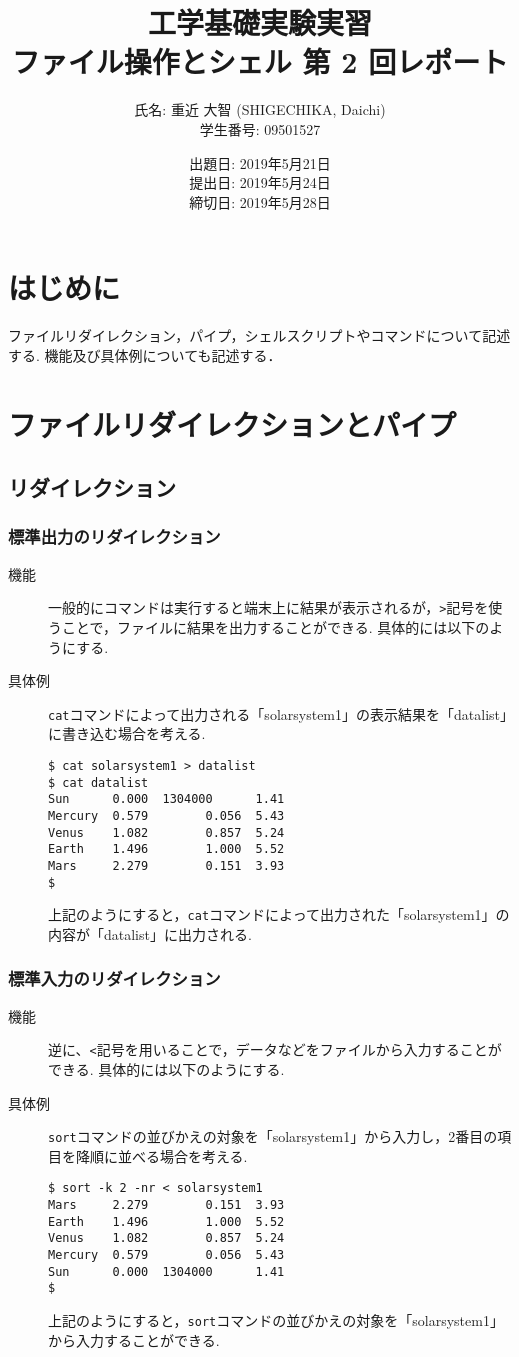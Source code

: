 \documentclass[a4j,11pt]{jarticle}
\title{工学基礎実験実習 \\
       ファイル操作とシェル 第 2 回レポート}
\author{氏名: 重近 大智 (SHIGECHIKA, Daichi) \\
        学生番号: 09501527}
\date{出題日: 2019年5月21日 \\
      提出日: 2019年5月24日 \\
      締切日: 2019年5月28日 \\}
\begin{document}
\maketitle

\section{はじめに}
ファイルリダイレクション，パイプ，シェルスクリプトやコマンドについて記述する.
機能及び具体例についても記述する．
\section{ファイルリダイレクションとパイプ}
 \subsection{リダイレクション}
\subsubsection{標準出力のリダイレクション}
   \begin{description}
\item[機能]
一般的にコマンドは実行すると端末上に結果が表示されるが，\verb|>|記号を使うことで，ファイルに結果を出力することができる. 具体的には以下のようにする.
\item[具体例]
\verb|cat|コマンドによって出力される「solarsystem1」の表示結果を「datalist」に書き込む場合を考える.
\begin{verbatim}
$ cat solarsystem1 > datalist
$ cat datalist
Sun      0.000  1304000      1.41
Mercury  0.579        0.056  5.43
Venus    1.082        0.857  5.24
Earth    1.496        1.000  5.52
Mars     2.279        0.151  3.93
$
\end{verbatim}
上記のようにすると，\verb|cat|コマンドによって出力された「solarsystem1」の内容が「datalist」に出力される.
   \end{description}

\subsubsection{標準入力のリダイレクション}
\begin{description}
\item[機能]
逆に、\verb|<|記号を用いることで，データなどをファイルから入力することができる. 具体的には以下のようにする.
\item[具体例]
\verb|sort|コマンドの並びかえの対象を「solarsystem1」から入力し，2番目の項目を降順に並べる場合を考える.
\begin{verbatim}
$ sort -k 2 -nr < solarsystem1
Mars     2.279        0.151  3.93
Earth    1.496        1.000  5.52
Venus    1.082        0.857  5.24
Mercury  0.579        0.056  5.43
Sun      0.000  1304000      1.41
$ 
\end{verbatim}
上記のようにすると，\verb|sort|コマンドの並びかえの対象を「solarsystem1」から入力することができる.
\end{description}
\end{document}
